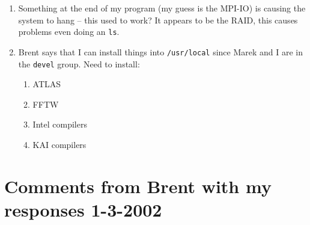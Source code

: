 \documentclass[10pt]{article}
\begin{document}
\begin{enumerate}
\item Something at the end of my program (my guess is the MPI-IO) is causing
the system to hang -- this used to work?  It appears to be the RAID, this
causes problems even doing an {\tt ls}.

\item Brent says that I can install things into {\tt /usr/local} since Marek
and I are in the {\tt devel} group. Need to install:
\begin{enumerate}
\item ATLAS
\item FFTW
\item Intel compilers
\item KAI compilers
\end{enumerate}

\end{enumerate}

\section*{\normalsize Comments from Brent with my responses 1-3-2002}
\end{document}
